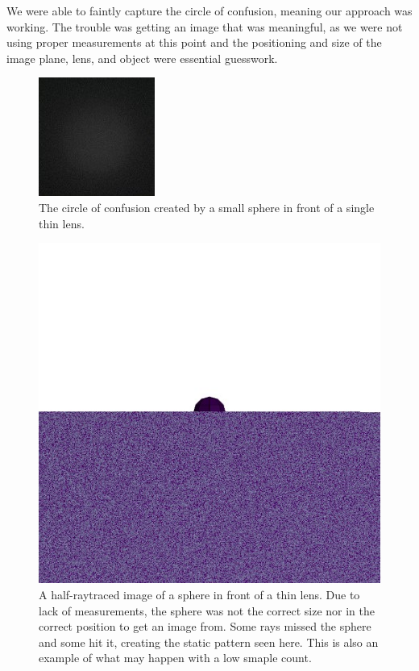 \documentclass[twocolumn]{article}
\begin{document}
We were able to faintly capture the circle of confusion, meaning our approach was working.
The trouble was getting an image that was meaningful, as we were not using proper measurements
at this point and the positioning  and size of the image plane, lens, and object were
essential guesswork.

\begin{figure}[h]
    \centering
    \includegraphics[scale=1.0]{img/ghost_coc.jpg}
    \caption{The circle of confusion created by a small sphere in front of a single thin
    lens.}
    \label{fig:ghost_coc}
\end{figure}

\begin{figure}[h]
    \centering
    \includegraphics[scale=0.5]{img/static.jpg}
    \caption{A half-raytraced image of a sphere in front of a thin lens. Due to lack of
    measurements, the sphere was not the correct size nor in the correct position to get
    an image from. Some rays missed the sphere and some hit it, creating the static pattern
    seen here. This is also an example of what may happen with a low smaple count.}
    \label{fig:static}
\end{figure}
\end{document}
